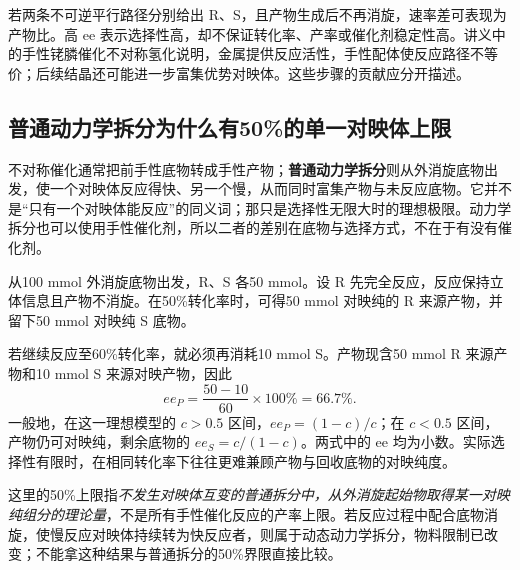 若两条不可逆平行路径分别给出 R、S，且产物生成后不再消旋，速率差可表现为产物比。高 ee 表示选择性高，却不保证转化率、产率或催化剂稳定性高。讲义中的手性铑膦催化不对称氢化说明，金属提供反应活性，手性配体使反应路径不等价；后续结晶还可能进一步富集优势对映体。这些步骤的贡献应分开描述。

\subsection{普通动力学拆分为什么有50\%的单一对映体上限}
不对称催化通常把前手性底物转成手性产物；\textbf{普通动力学拆分}则从外消旋底物出发，使一个对映体反应得快、另一个慢，从而同时富集产物与未反应底物。它并不是“只有一个对映体能反应”的同义词；那只是选择性无限大时的理想极限。动力学拆分也可以使用手性催化剂，所以二者的差别在底物与选择方式，不在于有没有催化剂。

\begin{worked}
从100 mmol 外消旋底物出发，R、S 各50 mmol。设 R 先完全反应，反应保持立体信息且产物不消旋。在50\%转化率时，可得50 mmol 对映纯的 R 来源产物，并留下50 mmol 对映纯 S 底物。

若继续反应至60\%转化率，就必须再消耗10 mmol S。产物现含50 mmol R 来源产物和10 mmol S 来源对映产物，因此
\[
 ee_P=\frac{50-10}{60}\times100\%=66.7\%.
\]
一般地，在这一理想模型的 $c>0.5$ 区间，$ee_P=(1-c)/c$；在 $c<0.5$ 区间，产物仍可对映纯，剩余底物的 $ee_S=c/(1-c)$。两式中的 ee 均为小数。实际选择性有限时，在相同转化率下往往更难兼顾产物与回收底物的对映纯度。
\end{worked}

这里的50\%上限指\emph{不发生对映体互变的普通拆分中，从外消旋起始物取得某一对映纯组分的理论量}，不是所有手性催化反应的产率上限。若反应过程中配合底物消旋，使慢反应对映体持续转为快反应者，则属于动态动力学拆分，物料限制已改变；不能拿这种结果与普通拆分的50\%界限直接比较。
